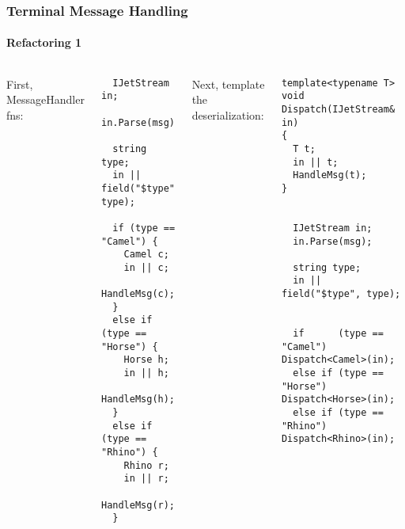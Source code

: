 \begin{frame}[fragile,t]
\frametitle{Terminal Message Handling}
\framesubtitle{Refactoring 1}
\begin{columns}[t]
\pause
{}
First, MessageHandler fns:
{\scriptsize\begin{verbatim}
  IJetStream in;
  in.Parse(msg);

  string type;
  in || field("$type", type);

  if (type == "Camel") {    
    Camel c; 
    in || c;
    HandleMsg(c);
  }
  else if (type == "Horse") { 
    Horse h; 
    in || h;
    HandleMsg(h);
  }
  else if (type == "Rhino") { 
    Rhino r; 
    in || r;
    HandleMsg(r);
  }
\end{verbatim}
}
\pause
{}
Next, template the deserialization:
{\scriptsize\begin{verbatim}
template<typename T> void Dispatch(IJetStream& in)
{
  T t;
  in || t;
  HandleMsg(t);
}


  IJetStream in;
  in.Parse(msg);

  string type;
  in || field("$type", type);


  if      (type == "Camel") Dispatch<Camel>(in);
  else if (type == "Horse") Dispatch<Horse>(in); 
  else if (type == "Rhino") Dispatch<Rhino>(in);

\end{verbatim}
}

\end{columns}

\end{frame}


